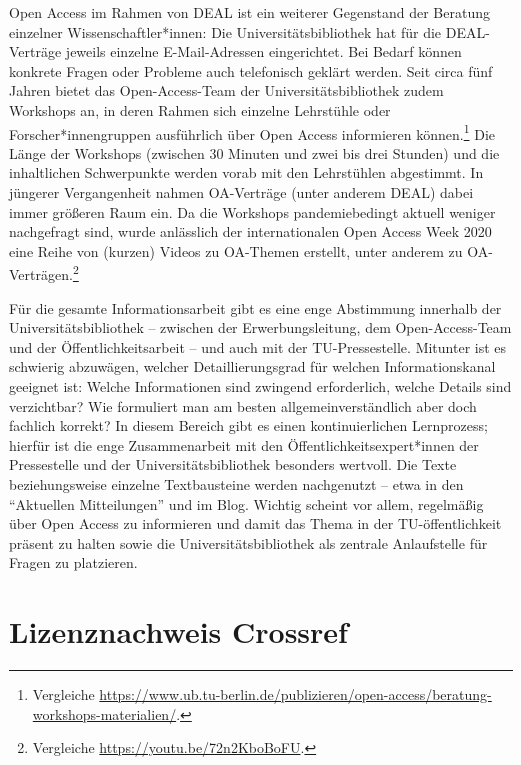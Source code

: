 \documentclass[a4paper,
fontsize=11pt,
oneside,
numbers=noperiodatend,
parskip=half-,
bibliography=totoc,
final
]{scrartcl}
\begin{document}
Open Access im Rahmen von DEAL ist ein weiterer Gegenstand der Beratung
einzelner Wissenschaftler*innen: Die Universitätsbibliothek hat für die
DEAL-Verträge jeweils einzelne E-Mail-Adressen eingerichtet. Bei Bedarf
können konkrete Fragen oder Probleme auch telefonisch geklärt werden.
Seit circa fünf Jahren bietet das Open-Access-Team der
Universitätsbibliothek zudem Workshops an, in deren Rahmen sich einzelne
Lehrstühle oder Forscher*innengruppen ausführlich über Open Access
informieren können.\footnote{Vergleiche
  \url{https://www.ub.tu-berlin.de/publizieren/open-access/beratung-workshops-materialien/}.}
Die Länge der Workshops (zwischen 30 Minuten und zwei bis drei Stunden)
und die inhaltlichen Schwerpunkte werden vorab mit den Lehrstühlen
abgestimmt. In jüngerer Vergangenheit nahmen OA-Verträge (unter anderem
DEAL) dabei immer größeren Raum ein. Da die Workshops pandemiebedingt
aktuell weniger nachgefragt sind, wurde anlässlich der internationalen
Open Access Week 2020 eine Reihe von (kurzen) Videos zu OA-Themen
erstellt, unter anderem zu OA-Verträgen.\footnote{Vergleiche
  \url{https://youtu.be/72n2KboBoFU}.}

Für die gesamte Informationsarbeit gibt es eine enge Abstimmung
innerhalb der Universitätsbibliothek -- zwischen der Erwerbungsleitung,
dem Open-Access-Team und der Öffentlichkeitsarbeit -- und auch mit der
TU-Pressestelle. Mitunter ist es schwierig abzuwägen, welcher
Detaillierungsgrad für welchen Informationskanal geeignet ist: Welche
Informationen sind zwingend erforderlich, welche Details sind
verzichtbar? Wie formuliert man am besten allgemeinverständlich aber
doch fachlich korrekt? In diesem Bereich gibt es einen kontinuierlichen
Lernprozess; hierfür ist die enge Zusammenarbeit mit den
Öffentlichkeitsexpert*innen der Pressestelle und der
Universitätsbibliothek besonders wertvoll. Die Texte beziehungsweise
einzelne Textbausteine werden nachgenutzt -- etwa in den
\enquote{Aktuellen Mitteilungen} und im Blog. Wichtig scheint vor allem,
regelmäßig über Open Access zu informieren und damit das Thema in der
TU-öffentlichkeit präsent zu halten sowie die Universitätsbibliothek als
zentrale Anlaufstelle für Fragen zu platzieren.

\hypertarget{lizenznachweis-crossref}{%
\section{Lizenznachweis Crossref}\label{lizenznachweis-crossref}}
\end{document}
